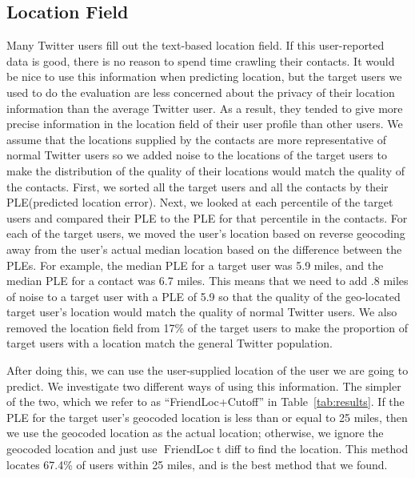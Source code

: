 \documentclass[letterpaper]{article}
\DeclareMathOperator{\FriendLoc}{FriendLoc}
\begin{document}
\subsection{Location Field}
Many Twitter users fill out the text-based location field.
%
If this user-reported data is good, there is no reason to spend time
crawling their contacts.
%
It would be nice to use this information when predicting location, but
the target users we used to do the evaluation are less concerned about
the privacy of their location information than the average Twitter user.
%
As a result, they tended to give more precise information in the location
field of their user profile than other users.
%
We assume that the locations supplied by the contacts are more
representative of normal Twitter users so we added noise to the locations
of the target users to make the distribution of the quality of their
locations would match the quality of the contacts.
%
First, we sorted all the target users and all the contacts by their
PLE(predicted location error).
%
Next, we looked at each percentile of the target users and compared
their PLE to the PLE for that percentile in the contacts.
%
For each of the target users, we moved the user's location based on
reverse geocoding away from the user's actual median location based on the
difference between the PLEs.
%
For example, the median PLE for a target user was 5.9 miles, and the median
PLE for a contact was 6.7 miles.
%
This means that we need to add .8 miles of noise to a target user
with a PLE of 5.9 so that the quality of the geo-located target user's location
would match the quality of normal Twitter users.
%
We also removed the location field from 17\% of the target users to
make the proportion of target users with a location match the general
Twitter population.

After doing this, we can use the user-supplied location of the user we are
going to predict.
%
We investigate two different ways of using this information.
%
The simpler of the two, which we refer to as ``FriendLoc+Cutoff'' in
Table~\ref{tab:results}.
%
If the PLE for the target user's geocoded location is less than or equal to 25
miles, then we use the geocoded location as the actual location; otherwise, we
ignore the geocoded location and just use $\FriendLoc$t diff to find the location.
%
This method locates 67.4\% of users within 25 miles, and is the best method
that we found.
\end{document}
